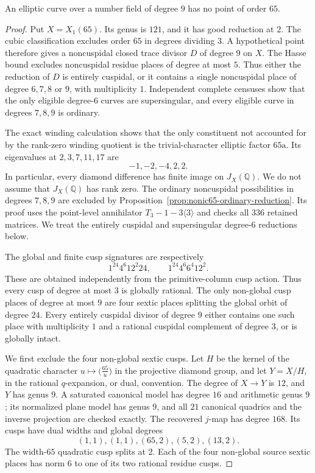 \begin{proposition}\label{prop:nonic65-exclusion}
An elliptic curve over a number field of degree $9$ has no point of order $65$.
\end{proposition}
\begin{proof}
Put $X=X_1(65)$. Its genus is $121$, and it has good reduction at $2$.
The cubic classification excludes order $65$ in degrees dividing $3$.
A hypothetical point therefore gives a noncuspidal closed trace divisor $D$ of degree $9$ on $X$.
The Hasse bound excludes noncuspidal residue places of degree at most $5$.
Thus either the reduction of $D$ is entirely cuspidal, or it contains a single noncuspidal place of degree $6,7,8$ or $9$, with multiplicity $1$.
Independent complete censuses show that the only eligible degree-$6$ curves are supersingular, and every eligible curve in degrees $7,8,9$ is ordinary.

The exact winding calculation shows that the only constituent not accounted for by the rank-zero winding quotient is the trivial-character elliptic factor $65\mathrm a$.
Its eigenvalues at $2,3,7,11,17$ are
\[
 -1,-2,-4,2,2.
\]
In particular, every diamond difference has finite image on $J_X(\mathbb Q)$.
We do not assume that $J_X(\mathbb Q)$ has rank zero.
The ordinary noncuspidal possibilities in degrees $7,8,9$ are excluded by Proposition~\ref{prop:nonic65-ordinary-reduction}.
Its proof uses the point-level annihilator $T_3-1-3\langle3\rangle$ and checks all $336$ retained matrices.
We treat the entirely cuspidal and supersingular degree-$6$ reductions below.

The global and finite cusp signatures are respectively
\[
 1^{24}4^6 12^2 24,\qquad 1^{24}4^6 6^4 12^2.
\]
These are obtained independently from the primitive-column cusp action.
Thus every cusp of degree at most $3$ is globally rational.
The only non-global cusp places of degree at most $9$ are four sextic places splitting the global orbit of degree $24$.
Every entirely cuspidal divisor of degree $9$ either contains one such place with multiplicity $1$ and a rational cuspidal complement of degree $3$, or is globally intact.

We first exclude the four non-global sextic cusps.
Let $H$ be the kernel of the quadratic character
$u\mapsto\bigl(\frac{65}{u}\bigr)$ in the projective diamond group, and let $Y=X/H$, in the rational $q$-expansion, or dual, convention.
The degree of $X\to Y$ is $12$, and $Y$ has genus $9$.
A saturated canonical model has degree $16$ and arithmetic genus $9$; its normalized plane model has genus $9$, and all $21$ canonical quadrics and the inverse projection are checked exactly.
The recovered $j$-map has degree $168$.
Its cusps have dual widths and global degrees
\[
 (1,1),(1,1),(65,2),(5,2),(13,2).
\]
The width-$65$ quadratic cusp splits at $2$.
Each of the four non-global source sextic places has norm $6$ to one of its two rational residue cusps.


\end{proof}
